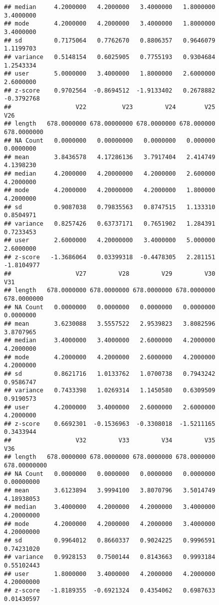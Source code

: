 \documentclass{article}
\begin{document}
\begin{verbatim}
## median     4.2000000   4.2000000   3.4000000   1.8000000   3.4000000
## mode       4.2000000   4.2000000   3.4000000   1.8000000   3.4000000
## sd         0.7175064   0.7762670   0.8806357   0.9646079   1.1199703
## variance   0.5148154   0.6025905   0.7755193   0.9304684   1.2543334
## user       5.0000000   3.4000000   1.8000000   2.6000000   2.6000000
## z-score    0.9702564  -0.8694512  -1.9133402   0.2678882  -0.3792768
##                  V22          V23         V24        V25         V26
## length   678.0000000 678.00000000 678.0000000 678.000000 678.0000000
## NA Count   0.0000000   0.00000000   0.0000000   0.000000   0.0000000
## mean       3.8436578   4.17286136   3.7917404   2.414749   4.1398230
## median     4.2000000   4.20000000   4.2000000   2.600000   4.2000000
## mode       4.2000000   4.20000000   4.2000000   1.800000   4.2000000
## sd         0.9087038   0.79835563   0.8747515   1.133310   0.8504971
## variance   0.8257426   0.63737171   0.7651902   1.284391   0.7233453
## user       2.6000000   4.20000000   3.4000000   5.000000   2.6000000
## z-score   -1.3686064   0.03399318  -0.4478305   2.281151  -1.8104977
##                  V27         V28         V29         V30         V31
## length   678.0000000 678.0000000 678.0000000 678.0000000 678.0000000
## NA Count   0.0000000   0.0000000   0.0000000   0.0000000   0.0000000
## mean       3.6230088   3.5557522   2.9539823   3.8082596   3.8707965
## median     3.4000000   3.4000000   2.6000000   4.2000000   4.2000000
## mode       4.2000000   4.2000000   2.6000000   4.2000000   4.2000000
## sd         0.8621716   1.0133762   1.0700738   0.7943242   0.9586747
## variance   0.7433398   1.0269314   1.1450580   0.6309509   0.9190573
## user       4.2000000   3.4000000   2.6000000   2.6000000   4.2000000
## z-score    0.6692301  -0.1536963  -0.3308018  -1.5211165   0.3433944
##                  V32         V33         V34         V35          V36
## length   678.0000000 678.0000000 678.0000000 678.0000000 678.00000000
## NA Count   0.0000000   0.0000000   0.0000000   0.0000000   0.00000000
## mean       3.6123894   3.9994100   3.8070796   3.5014749   4.18938053
## median     3.4000000   4.2000000   4.2000000   3.4000000   4.20000000
## mode       4.2000000   4.2000000   4.2000000   3.4000000   4.20000000
## sd         0.9964012   0.8660337   0.9024225   0.9996591   0.74231020
## variance   0.9928153   0.7500144   0.8143663   0.9993184   0.55102443
## user       1.8000000   3.4000000   4.2000000   4.2000000   4.20000000
## z-score   -1.8189355  -0.6921324   0.4354062   0.6987633   0.01430597

\end{verbatim}
\end{document}
